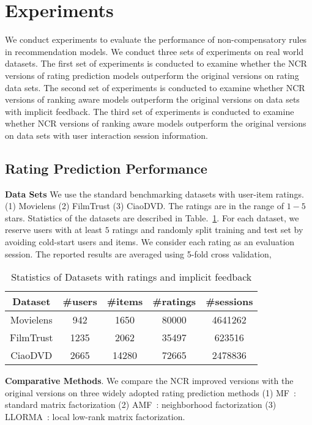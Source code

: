 \documentclass[letterpaper]{article} %
\begin{document}
\section{Experiments}\label{sec:experiment}
We conduct experiments to evaluate the performance of non-compensatory rules in recommendation models. We conduct three sets of experiments on real world datasets. The first set of experiments is conducted to examine whether the NCR versions of rating prediction models outperform the original versions on rating data sets. 
The second set of experiments is conducted to examine whether NCR versions of ranking aware models outperform the original versions on data sets with implicit feedback.
The third set of experiments is conducted to examine whether NCR versions of ranking aware models outperform the original versions on data sets with user interaction session information.

\subsection{Rating Prediction Performance}

\textbf{Data Sets} We use the standard benchmarking datasets with user-item ratings. (1) Movielens (2) FilmTrust (3) CiaoDVD. The ratings are in the range of $1-5$ stars. Statistics of the datasets are described in Table.~\ref{tab:datasets}. For each dataset, we reserve users with at least $5$ ratings and randomly split training and test set by avoiding cold-start users and items. We consider each rating as an evaluation session. The reported results are averaged using 5-fold cross validation, 

\begin{table}[htp]
\caption{Statistics of Datasets with ratings and implicit feedback}
\begin{center}
\begin{tabular}{|c|c|c|c|c|}
\hline
Dataset & \#users & \#items & \#ratings & \#sessions \\\hline
Movielens &942 &1650 &80000 &4641262 \\\hline
FilmTrust &1235 &2062 &35497 &623516 \\\hline
CiaoDVD &2665 &14280 &72665 &2478836 \\\hline
\end{tabular}
\end{center}
\label{tab:datasets}
\end{table}%
 

\textbf{Comparative Methods}. We compare the NCR improved versions with the original versions on three widely adopted rating prediction methods (1) MF~\cite{Koren2009Matrix}: standard matrix factorization  (2) AMF~\cite{Koren2008Factorization}: neighborhood factorization (3) LLORMA~\cite{Lee2013Local}: local low-rank matrix factorization. 
\end{document}
